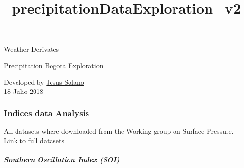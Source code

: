 \documentclass[11pt]{article}
\title{precipitationDataExploration\_v2}
\begin{document}
    
    
    \maketitle
    
    

    
     Weather Derivates

Precipitation Bogota Exploration

Developed by \href{mailto:ja.solano588@uniandes.edu.co}{Jesus Solano} \\
18 Julio 2018

    \subsubsection{Indices data Analysis}\label{indices-data-analysis}

All datasets where downloaded from the Working group on Surface
Pressure.
\href{https://www.esrl.noaa.gov/psd/gcos_wgsp/Timeseries/}{Link to full
datasets}

    \subparagraph{Southern Oscillation Index
(SOI)}\label{southern-oscillation-index-soi}
\end{document}
